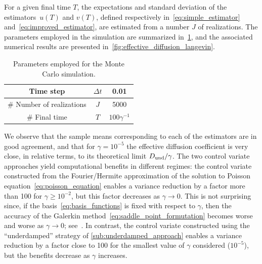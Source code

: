 \documentclass[11pt,a4paper]{article}
\begin{document}

For a given final time $T$,
the expectations and standard deviation of the estimators~$u(T)$ and $v(T)$,
defined respectively in~\eqref{eq:simple_estimator} and~\eqref{eq:improved_estimator},
are estimated from a number $J$ of realizations.
The parameters employed in the simulation are summarized in~\cref{table:parameters_employed_for_mc},
and the associated numerical results are presented in~\cref{fig:effective_diffusion_langevin}.
\begin{table}[ht]
    \centering
    \begin{tabular}{|c|c|c|}
        \hline
        Time step & $\Delta t$ & 0.01 \\
        \hline
        \# Number of realizations & $J$ & 5000 \\
        \hline
        \# Final time & $T$ & $100 \gamma^{-1}$ \\
        \hline
    \end{tabular}
    \caption{Parameters employed for the Monte Carlo simulation.}
    \label{table:parameters_employed_for_mc}
\end{table}
We observe that the sample means corresponding to each of the estimators are in good agreement,
and that for $\gamma = 10^{-5}$ the effective diffusion coefficient is very close, in relative terms,
to its theoretical limit $D_{\rm und}/\gamma$.
The two control variate approaches yield computational benefits in different regimes:
the control variate constructed from the Fourier/Hermite approximation of the solution to Poisson equation~\eqref{eq:poisson_equation}
enables a variance reduction by a factor more than 100 for $\gamma \geq 10^{-2}$,
but this factor decreases as $\gamma \to 0$.
This is not surprising since,
if the basis~\eqref{eq:basis_functions} is fixed with respect to $\gamma$,
then the accuracy of the Galerkin method~\eqref{eq:saddle_point_formutation} becomes worse and worse as $\gamma \to 0$;
see~\cite{roussel2018spectral}.
In contrast, the control variate constructed using the ``underdamped'' strategy of \cref{sub:underdamped_approach} enables a variance reduction by a factor close to 100 for the smallest value of $\gamma$ considered ($10^{-5}$),
but the benefits decrease as $\gamma$ increases.
\end{document}
